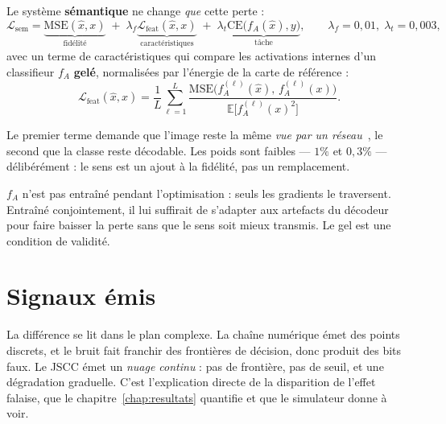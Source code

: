 Le système \textbf{sémantique} ne change \emph{que} cette perte :
\begin{equation}
  \mathcal{L}_{\text{sem}} = \underbrace{\mathrm{MSE}(\hat{x},x)}_{\text{fidélité}}
  \;+\; \lambda_f \underbrace{\mathcal{L}_{\text{feat}}(\hat{x},x)}_{\text{caractéristiques}}
  \;+\; \lambda_t \underbrace{\mathrm{CE}\big(f_A(\hat{x}), y\big)}_{\text{tâche}},
  \qquad \lambda_f = 0{,}01,\; \lambda_t = 0{,}003 ,
  \label{eq:loss_sem}
\end{equation}
avec un terme de caractéristiques qui compare les activations internes d'un classifieur $f_A$ \textbf{gelé},
normalisées par l'énergie de la carte de référence :
\begin{equation}
  \mathcal{L}_{\text{feat}}(\hat{x},x) = \frac{1}{L}\sum_{\ell=1}^{L}
  \frac{\mathrm{MSE}\big(f_A^{(\ell)}(\hat{x}),\, f_A^{(\ell)}(x)\big)}
       {\mathbb{E}\big[f_A^{(\ell)}(x)^2\big]} .
  \label{eq:loss_feat}
\end{equation}

Le premier terme demande que l'image reste la même \emph{vue par un réseau}~\cite{johnson2016}, le second que
la classe reste décodable. Les poids sont faibles — $1\%$ et $0{,}3\%$ — délibérément : le sens est un ajout
à la fidélité, pas un remplacement.

\begin{keybox}
$f_A$ n'est pas entraîné pendant l'optimisation : seuls les gradients le traversent. Entraîné conjointement,
il lui suffirait de s'adapter aux artefacts du décodeur pour faire baisser la perte sans que le sens soit
mieux transmis. Le gel est une condition de validité.
\end{keybox}

\section{Signaux émis}
\label{sec:signaux}

La différence se lit dans le plan complexe. La chaîne numérique émet des points discrets, et le bruit fait
franchir des frontières de décision, donc produit des bits faux. Le JSCC émet un \emph{nuage continu} : pas de
frontière, pas de seuil, et une dégradation graduelle. C'est l'explication directe de la disparition de
l'effet falaise, que le chapitre~\ref{chap:resultats} quantifie et que le simulateur donne à voir.
